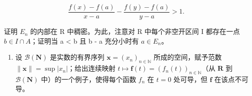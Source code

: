 \[
\frac {f (x) - f (a)}{x - a} - \frac {f (y) - f (a)}{y - a} > 1.
\]

证明 \(E_{n}\) 的内部在 R 中稠密。为此，注意对 R 中每个非空开区间 I 都存在一点 \(b \in I \cap A\)；证明当 a \textless{} b 且 b - a 充分小时有 \(a \in E_{n}\)。

\begin{enumerate}
\def\labelenumi{\arabic{enumi})}
\setcounter{enumi}{8}
\tightlist
\item
  设 \(\mathcal{B}(\mathbf{N})\) 是实数的有界序列 \(\mathbf{x} = (x_n)_{n\in \mathbb{N}}\) 所成的空间，赋予范数 \(\| \mathbf{x}\| = \sup |x_n|\)；给出连续映射 \(t\mapsto \mathbf{f}(t) = (f_n(t))_{n\in \mathbb{N}}\)（从 \(\mathbf{R}\) 到 \(\mathcal{B}(\mathbf{N})\) 中）的一个例子，使得每个函数 \(f_{n}\) 在 \(t = 0\) 处可导，但 \(\mathbf{f}\) 在该点不可导。
\end{enumerate}

\setcounter{exercisegroup}{1}
